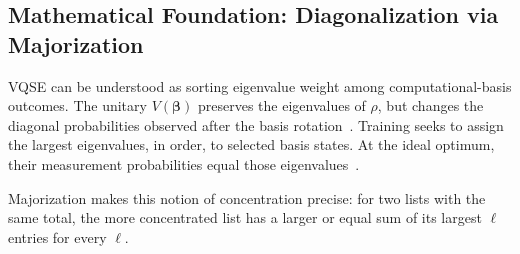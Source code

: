 \subsection{Mathematical Foundation: Diagonalization via Majorization}

VQSE can be understood as sorting eigenvalue weight among
computational-basis outcomes. The unitary $V(\boldsymbol{\beta})$
preserves the eigenvalues of $\rho$, but changes the diagonal
probabilities observed after the basis rotation~\cite{horn_johnson_2012_matrix}. Training seeks to
assign the largest eigenvalues, in order, to selected basis states.
At the ideal optimum, their measurement probabilities equal those
eigenvalues~\cite{cerezo2022vqse}.

Majorization makes this notion of concentration precise: for two lists with the same total, the more concentrated list has a larger or equal sum of its largest $\ell$ entries for every $\ell$.

